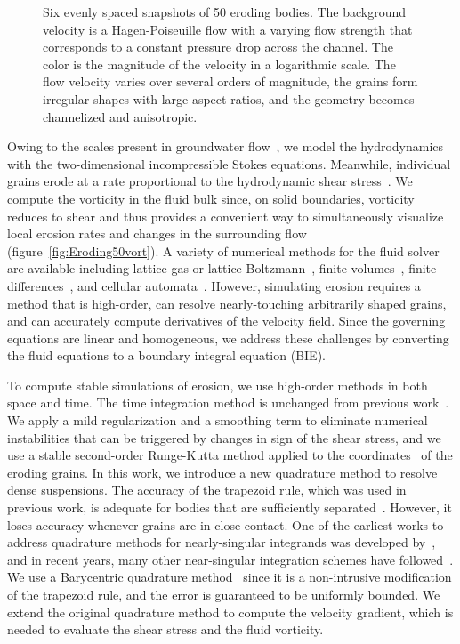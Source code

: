 \documentclass{jfm}
\begin{document}
\begin{figure}
\begin{center}
\caption{\label{fig:Eroding50vel} Six evenly spaced snapshots of 50
eroding bodies.  The background velocity is a Hagen-Poiseuille flow with
a varying flow strength that corresponds to a constant pressure drop
across the channel. The color is the magnitude of the velocity in a
logarithmic scale. The flow velocity varies over several orders of
magnitude, the grains form irregular shapes with large aspect ratios,
and the geometry becomes channelized and anisotropic.}
\end{center}
\end{figure}

Owing to the scales present in groundwater flow~\citep{bea1972}, we
model the hydrodynamics with the two-dimensional incompressible Stokes
equations.  Meanwhile, individual grains erode at a rate proportional to
the hydrodynamic shear stress~\citep{wan-fel2004,
ris-moo-chi-she-zha2012, moore2013self, par-izu2000}.  We compute the
vorticity in the fluid bulk since, on solid boundaries, vorticity
reduces to shear and thus provides a convenient way to simultaneously
visualize local erosion rates and changes in the surrounding flow
(figure~\ref{fig:Eroding50vort}).  A variety of numerical methods for
the fluid solver are available including lattice-gas or lattice
Boltzmann~\citep{kop-kat-tim1996, dar-mcc1998}, finite
volumes~\citep{suo-liu-gan2019, den-ica-hid2018,
sie-ili-pri-riv-gua2019}, finite differences~\citep{leb-ded-dav-bou2007,
knu-car2005}, and cellular automata~\citep{rot1988}.  However,
simulating erosion requires a method that is high-order, can resolve
nearly-touching arbitrarily shaped grains, and can accurately compute
derivatives of the velocity field.  Since the governing equations are
linear and homogeneous, we address these challenges by converting the
fluid equations to a boundary integral equation (BIE).

To compute stable simulations of erosion, we use high-order methods in
both space and time. The time integration method is unchanged from
previous work~\citep{qua-moo2018}.  We apply a mild regularization and a
smoothing term to eliminate numerical instabilities that can be
triggered by changes in sign of the shear stress, and we use a stable
second-order Runge-Kutta method applied to the {\thL}
coordinates~\citep{hou-low-she1994} of the eroding grains.  In this
work, we introduce a new quadrature method to resolve dense suspensions.
The accuracy of the trapezoid rule, which was used in previous work, is
adequate for bodies that are sufficiently separated~\citep{tre-wei2014}.
However, it loses accuracy whenever grains are in close contact.  One of
the earliest works to address quadrature methods for nearly-singular
integrands was developed by~\citet{bak-she1986}, and in recent years,
many other near-singular integration schemes have
followed~\citep{oja-tor2015, kli-tor2018, hel-oja2008a, bea-yin-wil2016,
bea-lai2001, klo-bar-gre-one2013}.  We use a Barycentric quadrature
method~\citep{bar2014, bar-wu-vee2015} since it is a non-intrusive
modification of the trapezoid rule, and the error is guaranteed to be
uniformly bounded.  We extend the original quadrature method to compute
the velocity gradient, which is needed to evaluate the shear stress and
the fluid vorticity.
\end{document}
